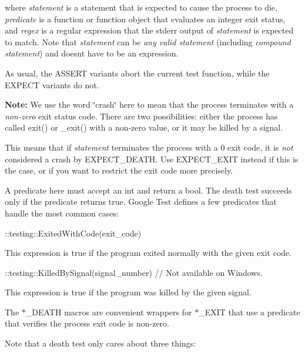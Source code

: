 where {\itshape statement} is a statement that is expected to cause the process to die, {\itshape predicate} is a function or function object that evaluates an integer exit status, and {\itshape regex} is a regular expression that the stderr output of {\itshape statement} is expected to match. Note that {\itshape statement} can be {\itshape any valid statement} (including {\itshape compound statement}) and doesn\textquotesingle{}t have to be an expression.

As usual, the {\ttfamily A\+S\+S\+E\+RT} variants abort the current test function, while the {\ttfamily E\+X\+P\+E\+CT} variants do not.

{\bfseries Note\+:} We use the word \char`\"{}crash\char`\"{} here to mean that the process terminates with a {\itshape non-\/zero} exit status code. There are two possibilities\+: either the process has called {\ttfamily exit()} or {\ttfamily \+\_\+exit()} with a non-\/zero value, or it may be killed by a signal.

This means that if {\itshape statement} terminates the process with a 0 exit code, it is {\itshape not} considered a crash by {\ttfamily E\+X\+P\+E\+C\+T\+\_\+\+D\+E\+A\+TH}. Use {\ttfamily E\+X\+P\+E\+C\+T\+\_\+\+E\+X\+IT} instead if this is the case, or if you want to restrict the exit code more precisely.

A predicate here must accept an {\ttfamily int} and return a {\ttfamily bool}. The death test succeeds only if the predicate returns {\ttfamily true}. Google Test defines a few predicates that handle the most common cases\+:


\begin{DoxyCode}
::testing::ExitedWithCode(exit\_code)
\end{DoxyCode}


This expression is {\ttfamily true} if the program exited normally with the given exit code.


\begin{DoxyCode}
::testing::KilledBySignal(signal\_number)  // Not available on Windows.
\end{DoxyCode}


This expression is {\ttfamily true} if the program was killed by the given signal.

The {\ttfamily $\ast$\+\_\+\+D\+E\+A\+TH} macros are convenient wrappers for {\ttfamily $\ast$\+\_\+\+E\+X\+IT} that use a predicate that verifies the process\textquotesingle{} exit code is non-\/zero.

Note that a death test only cares about three things\+:


